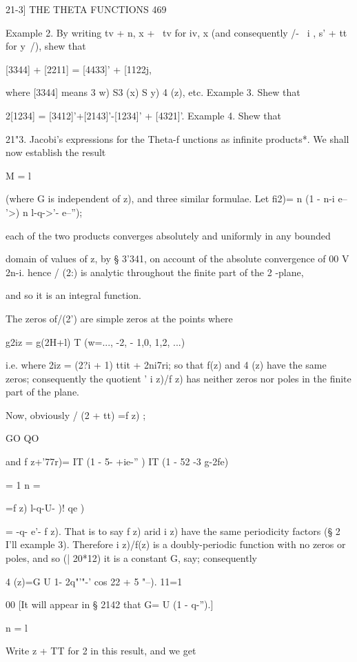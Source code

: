 21-3] THE THETA FUNCTIONS 469

Example 2. By writing tv + n, x + \ tv for iv, x (and consequently /-
\ i , s' + tt for y\ /), shew that

[3344] + [2211] = [4433]' + [1122j,

where [3344] means 3 w) S3 (x) S y) 4 (z), etc. Example 3. Shew that

2[1234] = [3412]'+[2143]'-[1234]' + [4321]'. Example 4. Shew that

21"3. Jacobi's expressions for the Theta-f unctions as infinite
products*. We shall now establish the result

M = l

(where G is independent of z), and three similar formulae. Let fi2)= n
(1 - n-i e-- '>) n l-q->'- e--'');

each of the two products converges absolutely and uniformly in any
bounded

domain of values of z, by § 3'341, on account of the absolute
convergence of 00 V 2n-i. hence / (2:) is analytic throughout the
finite part of the 2 -plane,

and so it is an integral function.

The zeros of/(2') are simple zeros at the points where

g2iz = g(2H+l) T (w=..., -2, - 1,0, 1,2, ...)

i.e. where 2iz = (2?i + 1) ttit + 2ni7ri; so that f(z) and 4 (z) have
the same zeros; consequently the quotient ' i z)/f z) has neither
zeros nor poles in the finite part of the plane.

Now, obviously / (2 + tt) =f z) ;

GO QO

and f z+'77r)= IT (1 - 5- +ie-'' ) IT (1 - 52 -3 g-2fe)

  = 1 n = \

=f z) l-q-U- )! qe )

= -q- e'- f z). That is to say f z) arid i z) have the same
periodicity factors (§ 2 I'll example 3). Therefore i z)/f(z) is a
doubly-periodic function with no zeros or poles, and so (| 20*12) it
is a constant G, say; consequently

 4 (z)=G U 1- 2q"'"-' cos 22 + 5 "--). 11=1

00 [It will appear in § 2142 that G= U (1 - q-'').]

n = l

Write z + TT for 2 in this result, and we get


